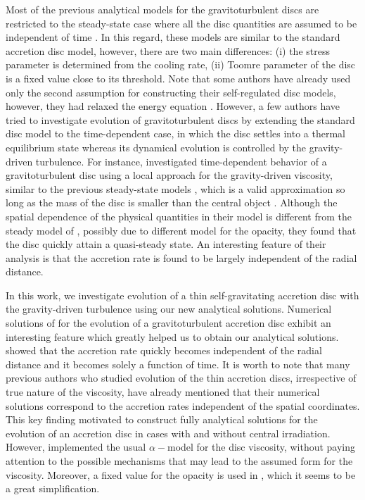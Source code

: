 \documentclass[apj]{emulateapj}
\begin{document}
Most of the previous analytical models for the gravitoturbulent discs are  restricted to the steady-state case where all the disc quantities are  assumed to be independent of time  \citep[][]{rafikov2009,Rafikov15}. In this regard, these models are similar to the standard accretion disc model, however, there are two main differences: (i) the stress parameter is determined from the cooling rate, (ii) Toomre parameter of the disc is  a fixed value close to its threshold. Note that some authors have already used only the second assumption for constructing their self-regulated disc models, however, they had relaxed the energy equation  \citep[e.g.,][]{Collin}.  However, a few authors have tried to investigate evolution of gravitoturbulent discs by extending the standard disc model to the time-dependent case, in which the disc settles into a thermal equilibrium state whereas its dynamical evolution is controlled by the gravity-driven turbulence.  For instance, \cite{rice2009} investigated time-dependent behavior  of a gravitoturbulent disc using a local approach for the gravity-driven viscosity, similar to the previous steady-state models \citep[e.g.,][]{rafikov2009}, which is a valid approximation so long as the mass of the disc is smaller than the central object  \citep[e.g.,][]{Balbus99,Lodato2004}. Although the spatial dependence of the physical quantities in their model is different from the steady model of \cite{rafikov2009}, possibly due to different model for the opacity, they found that the disc quickly attain a quasi-steady state. An interesting feature of their analysis is that the accretion rate is found to be largely independent of the radial distance.  


In this work, we investigate evolution of a thin self-gravitating accretion disc with the gravity-driven turbulence using our new  analytical solutions. Numerical solutions of \cite{rice2009} for the evolution of a gravitoturbulent accretion disc exhibit an interesting feature which greatly helped us to obtain our analytical solutions. \cite{rice2009} showed that the accretion rate quickly becomes independent of the radial distance and it becomes solely a function of time. It is worth to note that many previous authors who studied evolution of the thin accretion discs, irrespective of true nature of the viscosity, have already mentioned that their numerical solutions correspond to the accretion rates independent of the spatial coordinates. This key finding motivated \cite{chambers} to construct fully analytical solutions for the evolution of an accretion disc in cases with and without central irradiation. However, \cite{chambers} implemented the usual $\alpha -$model for the disc viscosity, without paying attention to the possible mechanisms that may lead to the assumed form for the viscosity. Moreover, a fixed value for the opacity is used in \cite{chambers}, which it seems to be a great simplification. 
\end{document}
